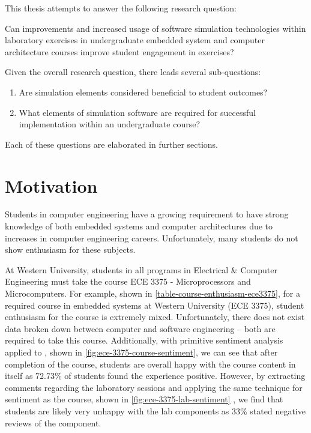 This thesis attempts to answer the following research question:

\begin{displayquote}
Can improvements and increased usage of software simulation technologies within laboratory exercises in undergraduate embedded system and computer architecture courses improve student engagement in exercises?
\end{displayquote}

Given the overall research question, there leads several sub-questions: 

\begin{enumerate}
	\item Are simulation elements considered beneficial to student outcomes?
	\item What elements of simulation software are required for successful implementation within an undergraduate course?
\end{enumerate}

Each of these questions are elaborated in further sections. 

\section{Motivation}

Students in computer engineering have a growing requirement to have strong knowledge of both embedded systems and computer architectures due to increases in computer engineering careers\cite[p.~30]{cec2016}\cite{bls2014}. Unfortunately, many students do not show enthusiasm for these subjects. 

At Western University, students in all programs in Electrical \& Computer Engineering must take the course ECE 3375 - Microprocessors and Microcomputers\cite{uwo-we-programprogression, eceoutline-ece3375}. For example, shown in \cref{table-course-enthusiasm-ece3375}, for a required course in embedded systems at Western University (ECE 3375)\cite{eceOutlines}, student enthusiasm for the course is extremely mixed. Unfortunately, there does not exist data broken down between computer and software engineering -- both are required to take this course. Additionally, with primitive sentiment analysis applied to \cite{evals:ece3375-2013, evals:ece3375-2014}, shown in \cref{fig:ece-3375-course-sentiment}, we can see that after completion of the course, students are overall happy with the course content in itself as 72.73\% of students found the experience positive. However, by extracting comments regarding the laboratory sessions and applying the same technique for sentiment as the course, shown in \cref{fig:ece-3375-lab-sentiment} , we find that students are likely very unhappy with the lab components as 33\% stated negative reviews of the component. 

